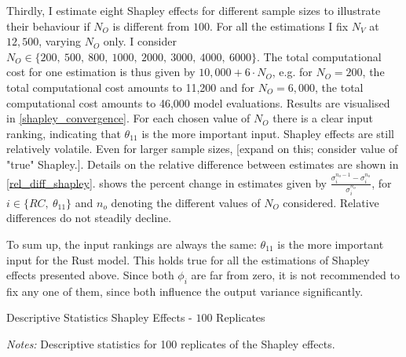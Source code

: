 Thirdly, I estimate eight Shapley effects for different sample sizes to illustrate their behaviour if $N_O$ is different from $100$. For all the estimations I fix $N_V$ at $12,500$, varying $N_O$ only. I consider $N_O \in \{200,\ 500,\ 800,\ 1000,\ 2000,\ 3000,\ 4000,\ 6000 \}$. The total computational cost for one estimation is thus given by $10,000 + 6 \cdot N_O$, e.g. for $N_O=200$, the total computational cost amounts to 11,200 and for $N_O=6,000$, the total computational cost amounts to 46,000 model evaluations. Results are visualised in \cref{shapley_convergence}. For each chosen value of $N_O$ there is a clear input ranking, indicating that $\theta_{11}$ is the more important input. Shapley effects are still relatively volatile. Even for larger sample sizes, [expand on this; consider value of "true" Shapley.]. Details on the relative difference between estimates are shown in \cref{rel_diff_shapley}.  shows the percent change in estimates given by $\frac{\sigma_i^{n_o-1} - \sigma_i^{n_o}}{\sigma_i^{n_o}}$, for $i \in \{RC,\ \theta_{11}\}$ and $n_o$ denoting the different values of $N_O$ considered. Relative differences do not steadily decline.


To sum up, the input rankings are always the same: $\theta_{11}$ is the more important input for the Rust model. This holds true for all the estimations of Shapley effects presented above. Since both $\phi_i$ are far from zero, it is not recommended to fix any one of them, since both influence the output variance significantly.

\begin{table}[t]
	\centering
	\caption{Descriptive Statistics Shapley Effects - $100$ Replicates}
	\label{shapley_descriptives}
	\begin{threeparttable}
	\centering
	
	\begin{tablenotes}
	\small
	\item \textit{Notes:} Descriptive statistics for 100 replicates of the Shapley effects.
	\end{tablenotes}
	\end{threeparttable}
\end{table}